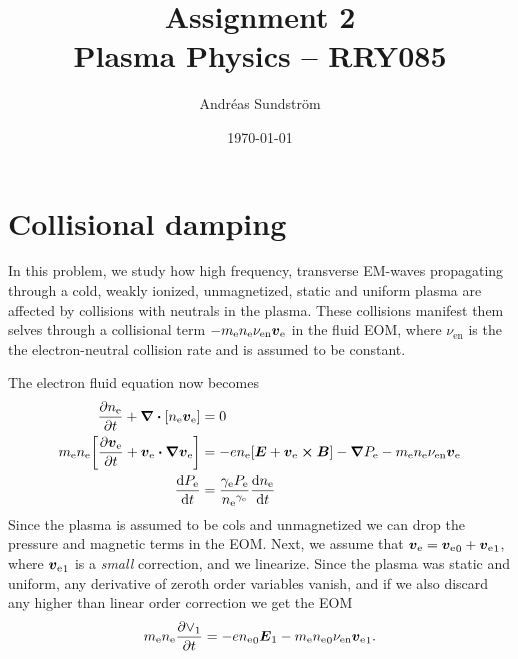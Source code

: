 \documentclass[11pt,a4paper, 
swedish, english %
]{article}
\newcommand{\mee}{\ensuremath{m_{\text{e}}}}
\newcommand{\nee}{\ensuremath{{n_{\text{e}}}}}
\newcommand{\nuen}{\ensuremath{{\nu_{\text{en}}}}}
\newcommand{\ve}{\ensuremath{{\vb*{v}_{\text{e}}}}}
\begin{document}


\title{Assignment 2 \\
{\Large Plasma Physics -- RRY085}}
\author{Andréas Sundström}
\date\today%

\maketitle


\section{Collisional damping}
In this problem, we study how high frequency, transverse EM-waves
propagating through a cold, weakly ionized, unmagnetized, static and
uniform plasma are affected by collisions with neutrals in the
plasma. These collisions manifest them selves through a collisional term
$-\mee\nee\nuen\ve$ in the fluid EOM, where $\nuen$ is the the
electron-neutral collision rate and is assumed to be constant.

The electron fluid equation now becomes
\begin{align}
\pdv{\nee}{t}+\div\qty[\nee\ve]&=0\\
\label{eq1:EOM0}
\mee\nee\qty[\pdv{\ve}{t}+\ve\vdot\grad\ve]
&=-e\nee\qty[\vb*E+\ve\cross\vb*B]-\grad P_\ee 
-\mee\nee\nuen\ve\\
\dv{P_\ee}{t}&=\frac{\gamma_\ee P_\ee}{\nee^{\gamma_\ee}}\dv{\nee}{t}
\end{align}
Since the plasma is assumed to be cols and unmagnetized we can drop
the pressure and magnetic terms in the EOM. Next, we assume that 
$\ve=\ve_0+\ve_1$, where $\ve_1$ is a \emph{small} correction, and we
linearize. Since the plasma was static and uniform, any derivative of
zeroth order variables vanish, and if we also discard any higher than
linear order correction we get the EOM
\begin{equation}\label{eq1:EOM}
\mee\nee\pdv{\vee_1}{t} = -e\nee_0\vb*E_1-\mee\nee_0\nuen\vb*\ve_1.
\end{equation}
\end{document}
